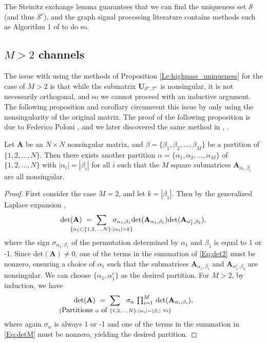 \documentclass{article}
\begin{document}
The Steinitz exchange lemma \cite{steinitz} guarantees that we can find the uniqueness set $\mathcal{S}$ (and thus $\mathcal{S}^c$), and the graph signal processing literature contains methods such as Algorithm 1 of \cite{shomorony} to do so.

\subsection{$M>2$ channels}
The issue with using the methods of Proposition \ref{Le:highpass_uniqueness} for the case of $M>2$ is that while the submatrix ${\mathbf{U}}_{{\mathcal S^c},{\mathcal T^c}}$ is nonsingular, it is not necessarily orthogonal, and so we cannot proceed with an inductive argument. The following proposition and corollary circumvent this issue by only using the nonsingularity of the original matrix. The proof of the following proposition is due to Federico Poloni \cite{poloni}, %
and we later discovered the same method in \cite{greeneMultiple}, \cite[Theorem 3.3]{greene_magnanti}.
\begin{proposition}\label{Pr:mat_part}
Let $\mathbf{A}$ be an $N \times N$ nonsingular matrix, and $\beta=\{\beta_1,\beta_2,\ldots,\beta_M\}$ be a partition of $\{1,2,\ldots,N\}$. Then there exists another partition $\alpha=\{\alpha_1,\alpha_2,\ldots,\alpha_M\}$ of $\{1,2,\ldots,N\}$ with $|\alpha_i|=|\beta_i|$ for all $i$ such that the $M$ square submatrices $\mathbf{A}_{\alpha_i,\beta_i}$ are all nonsingular.
\end{proposition}
\begin{proof}%
First consider the case $M=2$, and let $k=|\beta_1|$. Then by the generalized Laplace expansion \cite{gle}, 
\begin{align}\label{Eq:det2}
\mbox{det}(\mathbf{A})~=~\sum_{\mathclap{\{\alpha_1 \subset \{1,2,\ldots,N\}: |\alpha_1|=k \}}}~~\sigma_{\alpha_1,\beta_1} \mbox{det}(\mathbf{A}_{\alpha_1,\beta_1})\mbox{det}(\mathbf{A}_{\alpha_1^c,\beta_2}),
\end{align}
where the sign $\sigma_{\alpha_1,\beta_1}$ of the permutation determined by $\alpha_1$ and $\beta_1$ is equal to 1 or -1. Since $\mbox{det}(\mathbf{A})\neq 0$, one of the terms in the summation of \eqref{Eq:det2} must be nonzero, ensuring a choice of $\alpha_1$ such that the submatrices $\mathbf{A}_{\alpha_1,\beta_1}$ and $\mathbf{A}_{\alpha_1^c,\beta_2}$ are nonsingular. We can choose $\{\alpha_1,\alpha_1^c\}$ as the desired partition. For $M>2$, by induction, we have
\begin{align}\label{Eq:detM}
\mbox{det}(\mathbf{A})~=~\sum_{\mathclap{\{\hbox{Partitions } \alpha \hbox{ of }\{1,2,\ldots,N\}: |\alpha_i|=|\beta_i|~\forall i \}}}~~\sigma_{\alpha}~{\textstyle \prod_{i=1}^M}~\mbox{det}(\mathbf{A}_{\alpha_i,\beta_i}),
\end{align}
where again $\sigma_\alpha$ is always 1 or -1 and one of the terms in the summation in \eqref{Eq:detM} must be nonzero, yielding the desired partition. 
\end{proof}
\end{document}
